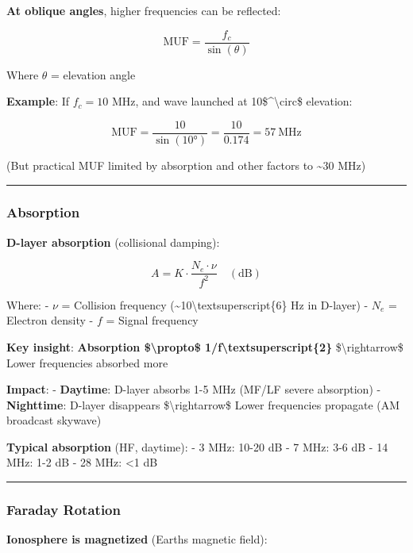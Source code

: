 \textbf{At oblique angles}, higher frequencies can be reflected:

\[
\text{MUF} = \frac{f_c}{\sin(\theta)}
\]

Where \(\theta\) = elevation angle

\textbf{Example}: If \(f_c = 10\) MHz, and wave launched at
10\$\^{}\textbackslash circ\$ elevation:

\[
\text{MUF} = \frac{10}{\sin(10°)} = \frac{10}{0.174} = 57\ \text{MHz}
\]

(But practical MUF limited by absorption and other factors to
\textasciitilde30 MHz)

\begin{center}\rule{0.5\linewidth}{0.5pt}\end{center}

\subsubsection{Absorption}\label{absorption}

\textbf{D-layer absorption} (collisional damping):

\[
A = K \cdot \frac{N_e \cdot \nu}{f^2} \quad (\text{dB})
\]

Where: - \(\nu\) = Collision frequency
(\textasciitilde10\textbackslash textsuperscript\{6\} Hz in D-layer) -
\(N_e\) = Electron density - \(f\) = Signal frequency

\textbf{Key insight}: \textbf{Absorption \$\textbackslash propto\$
1/f\textbackslash textsuperscript\{2\}} \$\textbackslash rightarrow\$
Lower frequencies absorbed more

\textbf{Impact}: - \textbf{Daytime}: D-layer absorbs 1-5 MHz (MF/LF
severe absorption) - \textbf{Nighttime}: D-layer disappears
\$\textbackslash rightarrow\$ Lower frequencies propagate (AM broadcast
skywave)

\textbf{Typical absorption} (HF, daytime): - 3 MHz: 10-20 dB - 7 MHz:
3-6 dB - 14 MHz: 1-2 dB - 28 MHz: \textless1 dB

\begin{center}\rule{0.5\linewidth}{0.5pt}\end{center}

\subsubsection{Faraday Rotation}\label{faraday-rotation}

\textbf{Ionosphere is magnetized} (Earth\textquotesingle s magnetic
field):


